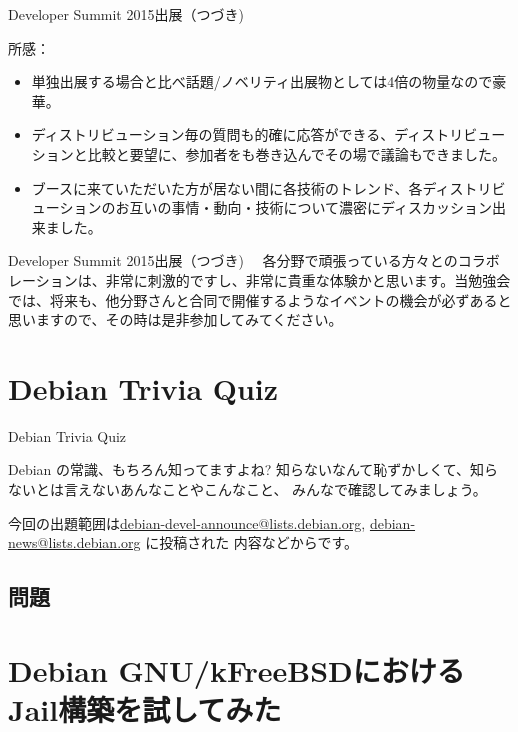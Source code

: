 \begin{frame}{Developer Summit 2015出展（つづき)}

所感：

\begin{itemize}
 \item 単独出展する場合と比べ話題/ノベリティ出展物としては4倍の物量なので豪華。
 \item ディストリビューション毎の質問も的確に応答ができる、ディストリビューションと比較と要望に、参加者をも巻き込んでその場で議論もできました。
 \item ブースに来ていただいた方が居ない間に各技術のトレンド、各ディストリビューションのお互いの事情・動向・技術について濃密にディスカッション出来ました。
\end{itemize}

\end{frame}

\begin{frame}{Developer Summit 2015出展（つづき)}
　各分野で頑張っている方々とのコラボレーションは、非常に刺激的ですし、非常に貴重な体験かと思います。当勉強会では、将来も、他分野さんと合同で開催するようなイベントの機会が必ずあると思いますので、その時は是非参加してみてください。
\end{frame}

\section{Debian Trivia Quiz}
\begin{frame}{Debian Trivia Quiz}

  Debian の常識、もちろん知ってますよね?
知らないなんて恥ずかしくて、知らないとは言えないあんなことやこんなこと、
みんなで確認してみましょう。

今回の出題範囲は\url{debian-devel-announce@lists.debian.org},
\url{debian-news@lists.debian.org} に投稿された
内容などからです。

\end{frame}

\subsection{問題}



\section{Debian GNU/kFreeBSDにおけるJail構築を試してみた}

